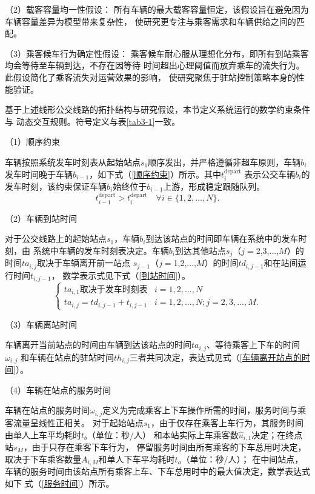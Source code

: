 （2）载客容量均一性假设：
所有车辆的最大载客容量恒定，该假设旨在避免因为车辆容量差异为模型带来复杂性，
使研究更专注与乘客需求和车辆供给之间的匹配。

（3）乘客候车行为确定性假设：
乘客候车耐心服从理想化分布，即所有到站乘客均会等待至车辆到达，不存在因等待
时间超出心理阈值而放弃乘车的流失行为。此假设简化了乘客流失对运营效果的影响，
使研究聚焦于驻站控制策略本身的性能验证。

基于上述线形公交线路的拓扑结构与研究假设，本节定义系统运行的数学约束条件与
动态交互规则。符号定义与表\ref{tab3-1}一致。

（1）顺序约束

车辆按照系统发车时刻表从起始站点$s_1$顺序发出，并严格遵循非超车原则，车辆$b_{i}$
发车时间晚于车辆$b_{i-1}$，如下式（\ref{顺序约束}）所示。其中$t_{i}^{\mathrm{depart}}$
表示公交车辆$b_{i}$的发车时刻，该约束保证车辆$b_{i}$始终位于$b_{i-1}$上游，形成稳定跟随队列。
\begin{equation}\label{顺序约束}
    t_{i-1}^{\mathrm{depart}} > t_{i}^{\mathrm{depart}} \quad \forall i \in \{1,2,\ldots,N\}.
\end{equation}

（2）车辆到站时间

对于公交线路上的起始站点$s_1$，车辆$b_i$到达该站点的时间即车辆在系统中的发车时刻，由
系统中车辆的发车时刻表决定。车辆$b_i$到达其他站点$s_j$（$j=$2,3,...,$M$）的时间$ta_{i,j}$取决于车辆离开前一站点
$s_{j-1}$（$j=$1,2,...,$M$）的时间$td_{i,j-1}$和在站间运行时间$t_{i,j-1}$，
数学表示式见下式（\ref{到站时间}）。
\begin{equation}\label{到站时间}
    \begin{cases}
    ta_{i,1} \text{取决于发车时刻表} & i= 1,2,...,N\\
    ta_{i,j} = td_{i,j-1} + t_{i,j-1} & i= 1,2,...,N; j = 2,3,...,M.
    \end{cases}
\end{equation}

（3）车辆离站时间

车辆离开当前站点的时间由车辆到达该站点的时间$ta_{i,j}$、等待乘客上下车的时间$\omega_{i,j}$
和车辆在站点的驻站时间$th_{i,j}$三者共同决定，表达式见式（\ref{车辆离开站点的时间}）。

（4）车辆在站点的服务时间

车辆在站点的服务时间$\omega_{i,j}$定义为完成乘客上下车操作所需的时间，服务时间与乘客流量呈线性正相关。
对于起始站点$s_1$，由于仅存在乘客上车行为，其服务时间由单人上车平均耗时$t_b$（单位：秒/人）
和本站实际上车乘客数$\hat{u}_{i,1}$决定；在终点站$s_{M}$，由于只存在乘客下车行为，
停留服务时间由所有乘客的下车总用时决定，取决于下车乘客数量$A_{i,M} $和单人下车平均耗时$t_{a}$（单位：秒/人）；
在中间站点，车辆的服务时间由该站点所有乘客上车、下车总用时中的最大值决定，数学表达式如下
式（\ref{服务时间}）所示。

